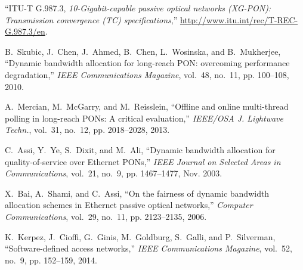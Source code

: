 \documentclass[pdftex,journal]{IEEEtran}
\begin{document}
\begin{thebibliography}{10}
``{ITU-T G.987.3}, \textit{10-Gigabit-capable passive optical networks
  (XG-PON): Transmission convergence (TC) specifications},''
  \url{http://www.itu.int/rec/T-REC-G.987.3/en}.

B.~Skubic, J.~Chen, J.~Ahmed, B.~Chen, L.~Wosinska, and B.~Mukherjee, ``Dynamic
  bandwidth allocation for long-reach {PON}: overcoming performance
  degradation,'' \emph{IEEE Communications Magazine}, vol.~48, no.~11, pp.
  100--108, 2010.

A.~Mercian, M.~McGarry, and M.~Reisslein, ``Offline and online multi-thread
  polling in long-reach {PON}s: A critical evaluation,'' \emph{IEEE/OSA J.
  Lightwave Techn.}, vol.~31, no.~12, pp. 2018--2028, 2013.

C.~Assi, Y.~Ye, S.~Dixit, and M.~Ali, ``Dynamic bandwidth allocation for
  quality-of-service over {Ethernet PONs},'' \emph{IEEE Journal on Selected
  Areas in Communications}, vol.~21, no.~9, pp. 1467--1477, Nov. 2003.

X.~Bai, A.~Shami, and C.~Assi, ``On the fairness of dynamic bandwidth
  allocation schemes in {Ethernet} passive optical networks,'' \emph{Computer
  Communications}, vol.~29, no.~11, pp. 2123--2135, 2006.

K.~Kerpez, J.~Cioffi, G.~Ginis, M.~Goldburg, S.~Galli, and P.~Silverman,
  ``Software-defined access networks,'' \emph{IEEE Communications Magazine},
  vol.~52, no.~9, pp. 152--159, 2014.

\end{thebibliography}
\end{document}
